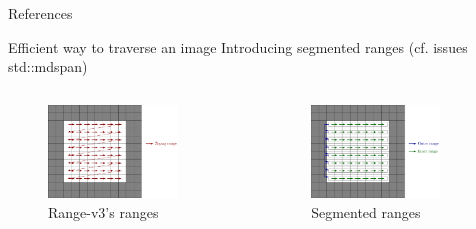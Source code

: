 \documentclass[12pt,aspectratio=169]{beamer}
\newcommand{\themename}{\textbf{\textsc{metropolis}}\xspace}
\begin{document}
\appendix

\begin{frame}[allowframebreaks]{References}
  \AtNextBibliography{\footnotesize}
  \printbibliography[heading=none]
\end{frame}

%
%

\begin{frame}[fragile]{Efficient way to traverse an image}
  Introducing segmented ranges (cf. issues std::mdspan)
  \begin{columns}[T,onlytextwidth]
    \begin{figure}
      \includegraphics[width=0.8\textwidth]{../figures/linear_rng}
      \caption{Range-v3's ranges}
    \end{figure}

    \begin{figure}
      \includegraphics[width=0.8\textwidth]{../figures/segmented_rng}
      \caption{Segmented ranges}
    \end{figure}
  \end{columns}
\end{frame}
\end{document}
